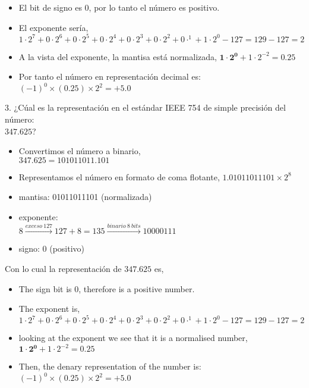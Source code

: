 \begin{paracol}{2}
\begin{itemize}[leftmargin=\dimexpr 26pt-.25in]
\item El bit de signo es 0, por lo tanto el número es positivo.
\item El exponente sería, $1\cdot2^7+0\cdot2^6+0\cdot2^5+0\cdot2^4+0\cdot2^3+0\cdot2^2+0\cdot^1+1\cdot2^0-127=129-127=2$
\item A la vista del exponente, la mantisa está normalizada, $\mathbf{1\cdot 2^0}+1\cdot2^{-2}=0.25$
\item Por tanto el número en representación decimal es: $ (-1)^0\times(0.25)\times2^{2}=+5.0$
\end{itemize}

3. ¿Cúal es la representación en el estándar IEEE 754 de simple precisión del número:\\ $347.625$?
\begin{itemize}[leftmargin=\dimexpr 26pt-.25in]
\item  Convertimos el número a binario,\\ $347.625 = 101011011.101$
\item Representamos el número en formato de coma flotante, $1.01011011101\times 2^{8}$
\item mantisa: 01011011101 (normalizada)
\item exponente:\\ $8 \xrightarrow{exceso\ 127} 127+8=135  \xrightarrow{binario \ 8 \ bits} 10000111$
\item signo: 0 (positivo)
\end{itemize}
Con lo cual la representación de $347.625$ es, 
\switchcolumn
\begin{itemize}[leftmargin=\dimexpr 26pt-.25in]
	\item The sign bit is 0, therefore is a positive number.
	\item The exponent is, $1\cdot2^7+0\cdot2^6+0\cdot2^5+0\cdot2^4+0\cdot2^3+0\cdot2^2+0\cdot^1+1\cdot2^0-127=129-127=2$
	\item looking at the exponent we see that it is a normalised number, $\mathbf{1\cdot 2^0}+1\cdot2^{-2}=0.25$
	\item Then, the denary representation of the number is: $ (-1)^0\times(0.25)\times2^{2}=+5.0$
\end{itemize}


\end{paracol}
